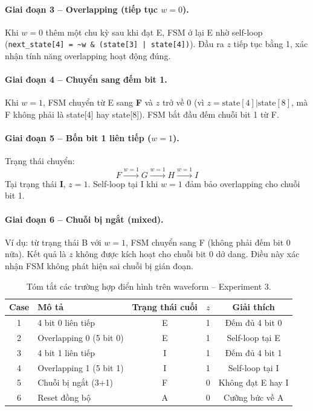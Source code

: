 \documentclass[12pt, a4paper]{article}
\begin{document}
\paragraph{Giai đoạn 3 -- Overlapping (tiếp tục $w = 0$).}
Khi $w = 0$ thêm một chu kỳ sau khi đạt E, FSM ở lại E nhờ self-loop (\texttt{next\_state[4] = \textasciitilde{}w \& (state[3] | state[4])}). Đầu ra $z$ tiếp tục bằng 1, xác nhận tính năng overlapping hoạt động đúng.

\paragraph{Giai đoạn 4 -- Chuyển sang đếm bit 1.}
Khi $w = 1$, FSM chuyển từ E sang \textbf{F} và $z$ trở về 0 (vì $z = \text{state}[4] | \text{state}[8]$, mà F không phải là state[4] hay state[8]). FSM bắt đầu đếm chuỗi bit 1 từ F.

\paragraph{Giai đoạn 5 -- Bốn bit 1 liên tiếp ($w = 1$).}
Trạng thái chuyển:
\[
F \xrightarrow{w=1} G \xrightarrow{w=1} H \xrightarrow{w=1} I
\]
Tại trạng thái \textbf{I}, $z = 1$. Self-loop tại I khi $w = 1$ đảm bảo overlapping cho chuỗi bit 1.

\paragraph{Giai đoạn 6 -- Chuỗi bị ngắt (mixed).}
Ví dụ: từ trạng thái B với $w = 1$, FSM chuyển sang F (không phải đếm bit 0 nữa). Kết quả là $z$ không được kích hoạt cho chuỗi bit 0 dở dang. Điều này xác nhận FSM không phát hiện sai chuỗi bị gián đoạn.

\begin{table}[H]
\centering
\caption{Tóm tắt các trường hợp điển hình trên waveform -- Experiment 3.}
\label{tab:wave-exp3}
\begin{tabular}{clccc}
\toprule
\textbf{Case} & \textbf{Mô tả} & \textbf{Trạng thái cuối} & \textbf{$z$} & \textbf{Giải thích} \\
\midrule
1 & 4 bit 0 liên tiếp         & E & 1 & Đếm đủ 4 bit 0 \\
2 & Overlapping 0 (5 bit 0)   & E & 1 & Self-loop tại E \\
3 & 4 bit 1 liên tiếp         & I & 1 & Đếm đủ 4 bit 1 \\
4 & Overlapping 1 (5 bit 1)   & I & 1 & Self-loop tại I \\
5 & Chuỗi bị ngắt (3+1)       & F & 0 & Không đạt E hay I \\
6 & Reset đồng bộ              & A & 0 & Cưỡng bức về A \\
\bottomrule
\end{tabular}
\end{table}
\end{document}
